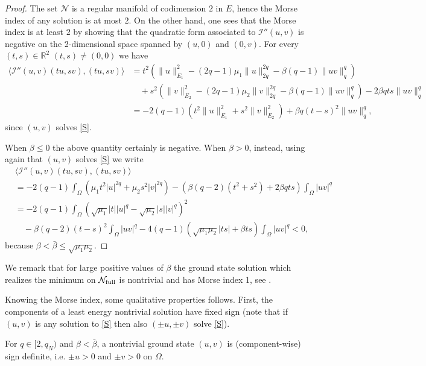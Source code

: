 \documentclass[reqno]{amsart}
\begin{document}
\begin{proof}
The set $\mathcal N$ is a regular manifold of codimension $2$ in $E$, hence the Morse
index of any solution is at most $2$.
On the other hand, one sees that the Morse index is at least $2$ by showing that
the quadratic form associated to $\mathcal I''(u,v)$ is negative on the 2-dimensional
space spanned by $(u,0)$ and $(0,v)$.
 For every $(t,s)\in \mathbb{R}^2$ $(t,s)\neq(0,0)$ we have
\begin{align*}
 \langle \mathcal I''(u,v)  (tu,sv) , (tu, sv)\rangle
&= t^2 \left( \|u\|_{E_1}^2 -(2q\!-\!1)\mu_1 \|u\|_{2q}^{2q}
  - \beta (q\!-\!1)\|uv\|_q^q \right)  \\
&\quad + s^2\left( \|v\|_{E_2}^2 -(2q\!-\!1)\mu_2 \|v\|_{2q}^{2q}
  - \beta (q\!-\!1)\|uv\|_q^q \right)  - 2\beta q ts \|uv\|_q^{q}\\
& = -2(q-1) \left( t^2 \|u\|_{E_1}^2 + s^2 \|v\|_{E_2}^2\right)
 +\beta q (t-s)^2 \|uv\|_q^{q},
\end{align*}
 since $(u,v)$ solves \eqref{S}.

When $\beta\le 0$ the above quantity certainly is negative.
When $\beta>0$, instead, using again that $(u,v)$ solves \eqref{S} we write
\begin{align*}
&\langle \mathcal I''(u,v)  (tu,sv) , (tu, sv)\rangle \\
&= -2(q-1) \int_{\Omega}\left(\mu_1 t^2 |u|^{2q} + \mu_2 s^2|v|^{2q} \right)
 -\left(\beta (q-2) (t^2+s^2) +2\beta qts \right) \int_{\Omega}|uv|^q \\
&=  -2(q-1) \int_{\Omega}\left(\sqrt{\mu_1} |t| |u|^{q} - \sqrt{\mu_2} |s||v|^{q}
 \right)^2 \\
&\quad - \beta (q-2)(t-s)^2\int_{\Omega}|uv|^q
  - 4(q-1)\left(\sqrt{\mu_1\mu_2} |ts|+\beta ts \right) \int_{\Omega}|uv|^q
<0 ,
\end{align*}
because $\beta<\bar\beta\le \sqrt{\mu_1\mu_2}$.
\end{proof}

We remark that for large positive values of $\beta$ the ground state solution
which realizes the minimum on $\mathcal N_{\rm full}$ is nontrivial and has
Morse index 1, see \cite{MMP_JDE06}.

Knowing the Morse index, some qualitative properties follows.
First, the components of a least energy nontrivial solution  have fixed sign
(note that if $(u,v)$ is any solution to \eqref{S} then also $(\pm u, \pm v)$
solve \eqref{S}).

\begin{corollary}\label{cor:positive}
For $q\in [2,q_N)$ and $\beta <\bar\beta $, a  nontrivial ground state $(u,v)$
is (component-wise) sign definite, i.e. $\pm u>0$ and $\pm v>0$ on $\Omega$.
\end{corollary}
\end{document}
